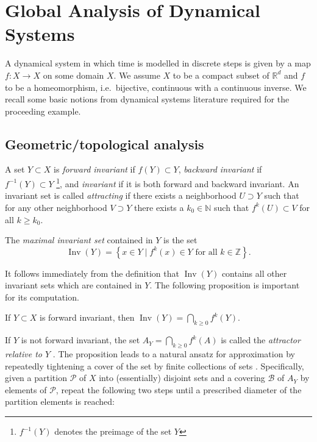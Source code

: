 \documentclass{juliacon}
\newcommand{\R}{{\mathbb R}}
\newcommand{\N}{{\mathbb N}}
\newcommand{\Z}{{\mathbb Z}}
\newcommand{\cB}{\mathcal{B}}
\newcommand{\cP}{\mathcal{P}}
\newcommand{\Inv}{\mathop{\mathrm{Inv}}}
\begin{document}

\section{Global Analysis of Dynamical Systems}
\label{sec:computations}

A dynamical system in which time is modelled in discrete steps is given by a map $f : X \to X$ on some domain $X$. We assume $X$ to be a compact subset of $\R^d$ and $f$ to be a homeomorphism, i.e.\ bijective, continuous with a continuous inverse. We recall some basic notions from dynamical systems literature required for the proceeding example. 

\subsection{Geometric/topological analysis}\label{sec:attractors}

A set $Y \subset X$ is \emph{forward invariant} if $f(Y) \subset Y$, \emph{backward invariant} if $f^{-1}(Y) \subset Y$ \footnote{$f^{-1}(Y)$ denotes the preimage of the set $Y$}, and \emph{invariant} if it is both forward and backward invariant. An invariant set is called \emph{attracting} if there exists a neighborhood $U \supset Y$ such that for any other neighborhood $V \supset Y$ there exists a $k_0 \in \N$ such that $f^k (U) \subset V$ for all $k\geq k_0$. 

The \emph{maximal invariant set} contained in $Y$ is the set 
    \begin{equation}
        \Inv (Y) = \left\{ x \in Y \mid f^k(x) \in Y \text{ for all } k\in\Z \right\}.
    \end{equation}

It follows immediately from the definition that $\Inv (Y)$ contains all other invariant sets which are contained in $Y$. The following proposition is important for its computation. 

\begin{proposition}
    \cite{maxinvset}
    If $Y \subset X$ is forward invariant, then $\Inv (Y) = \bigcap_{k \geq 0} f^k (Y)$. 
\end{proposition}

If $Y$ is not forward invariant, the set $A_Y=\bigcap_{k \geq 0} f^k (A)$ is called the \emph{attractor relative to $Y$} \cite{DeHo:97}. The proposition leads to a natural ansatz for approximation by repeatedly tightening a cover of the set by finite collections of sets \cite{DeHo:97}. Specifically, given a partition $\cP$ of $X$ into (essentially) disjoint sets and a covering $\cB$ of $A_Y$ by elements of $\cP$, repeat the following two steps until a prescribed diameter of the partition elements is reached:
\end{document}
